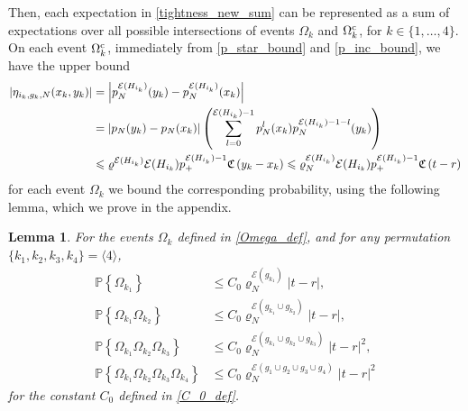 \documentclass[11pt,reqno]{amsart}
\numberwithin{equation}{section}
\newcommand{\abs}[1]{\left\lvert #1 \right\rvert}
\newcommand{\sprod}[1]{\langle#1\rangle}
\newcommand{\pk}[1]{\mathbb{P} \left\{ #1 \right \} }
\newtheorem{lem}[theo]{Lemma}
\begin{document}
Then, each expectation in \eqref{tightness_new_sum} can be represented as a sum of expectations over all possible intersections of events $\Omega_k$ and $\Omega_k^{\rm c}$, for $k\in\{1,\ldots,4\}$.  
On each event $\Omega_k^{\rm c}$, immediately from \eqref{p_star_bound} and \eqref{p_inc_bound}, we have the upper bound
\begin{align}
    \abs{\eta_{i_k,g_k,N}(x_k,y_k)} &= \abs{p_N^{\mathcal{E}({H}_{i_k})}(y_k) - p_N^{\mathcal{E}({H}_{i_k})}(x_k)}\notag\\
    &=\abs{p_N(y_k) - p_N(x_k)}\left(\sum_{l=0}^{\mathcal{E}({H}_{i_k}) - 1} p_N^{l}(x_k)p_N^{\mathcal{E}({H}_{i_k}) - 1 - l}(y_k) \right)\notag\\
    &\leqslant \varrho^{\mathcal{E}({H}_{i_k})}\mathcal{E}({H}_{i_k})p_+^{\mathcal{E}({H}_{i_k})-1}{\mathfrak{C}}\,(y_k-x_k)\leqslant \varrho_N^{\mathcal{E}({H}_{i_k})}\mathcal{E}({H}_{i_k})p_+^{\mathcal{E}({H}_{i_k})-1}{\mathfrak{C}}\,(t-r)\label{O_c_bound}
\end{align}
{for} each event $\Omega_k$ we bound the corresponding probability, using the following lemma, which we prove in the appendix.

\begin{lem}\label{lem:omega_bound}
     For the events $\Omega_k$ defined in \eqref{Omega_def}, and for any permutation $\{k_1,k_2,k_3,k_4\} = \sprod{4}$,
    \begin{align*}
        \pk{\Omega_{k_1}}&\leqslant C_0\varrho_N^{\mathcal{E}(g_{k_1})}\abs{t-r},\\
        \pk{\Omega_{k_1}\Omega_{k_2}}&\leqslant C_0\varrho_N^{\mathcal{E}(g_{k_1}\cup g_{k_2})}\abs{t-r},\\
        \pk{\Omega_{k_1}\Omega_{k_2}\Omega_{k_3}}&\leqslant C_0\varrho_N^{\mathcal{E}(g_{k_1}\cup g_{k_2}\cup g_{k_3})}\abs{t-r}^2,\\
        \pk{\Omega_{k_1}\Omega_{k_2}\Omega_{k_3}\Omega_{k_4}}&\leqslant C_0\varrho_N^{\mathcal{E}(g_{1}\cup g_{2}\cup g_{3}\cup g_{4})}\abs{t-r}^2
    \end{align*}
    for the constant $C_0$ defined in \eqref{C_0_def}.
\end{lem}
\end{document}
